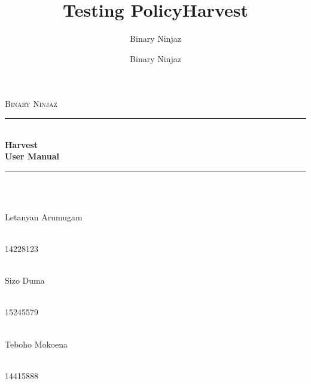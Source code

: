 \documentclass[12pt]{article}
\title{Testing Policy}
\author{Binary Ninjaz}
\date{}
\author{Binary Ninjaz}
\title{Harvest}
\begin{document}
\begin{titlepage}

	\begin{center}
		\textsc{\LARGE Binary Ninjaz}\\[0.3cm]
		\rule{\linewidth}{0.5mm} \\[0.5cm]
		{ \huge \bfseries Harvest \\
		  \vspace{0.3cm}\large \bfseries User Manual}\\[0.5cm]
		\rule{\linewidth}{0.5mm} \\[1cm]


		\begin{minipage}{0.4\textwidth}
			\begin{flushleft} \large
				\emph{} \\
				Letanyan {Arumugam}
			\end{flushleft}
		\end{minipage}
		\begin{minipage}{0.4\textwidth}
			\begin{flushright} \large
				\emph{} \\
				14228123
			\end{flushright}
		\end{minipage}

		\begin{minipage}{0.4\textwidth}
			\begin{flushleft} \large
            	\emph{} \\
				Sizo {Duma}
			\end{flushleft}
		\end{minipage}
		\begin{minipage}{0.4\textwidth}
			\begin{flushright} \large
				\emph{} \\
				15245579
			\end{flushright}
		\end{minipage}

		\begin{minipage}{0.4\textwidth}
			\begin{flushleft} \large
				\emph{} \\
				Teboho {Mokoena}
			\end{flushleft}
		\end{minipage}
		\begin{minipage}{0.4\textwidth}
			\begin{flushright} \large
				\emph{} \\
				14415888
			\end{flushright}
		\end{minipage}


\end{center}
\end{titlepage}
\end{document}
